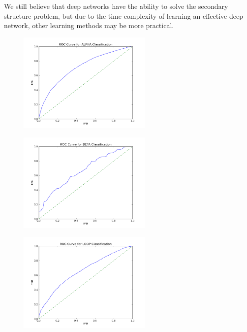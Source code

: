 \documentclass[letterpaper,twocolumn,12pt]{article}
\begin{document}
We still believe that deep networks have the ability to solve the secondary structure problem, but due to the time complexity of learning an effective deep network, other learning methods may be more practical.

\begin{figure}[ht!]
\centering
\includegraphics[width=65mm]{results/ROC_ALPHA.png}
\caption{}
\label{fig:roc_alpha}
\end{figure}

\begin{figure}[ht!]
\centering
\includegraphics[width=65mm]{results/ROC_BETA.png}
\caption{}
\label{fig:roc_beta}
\end{figure}

\begin{figure}[ht!]
\centering
\includegraphics[width=65mm]{results/ROC_LOOP.png}
\caption{}
\label{fig:roc_loop}
\end{figure}
\end{document}

